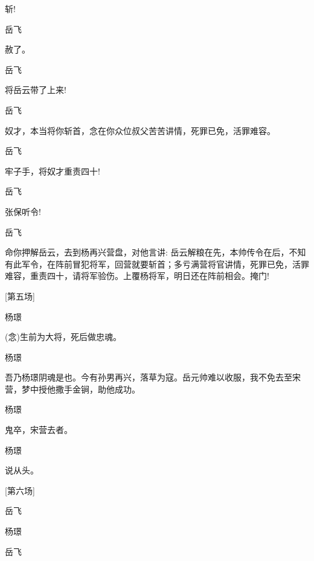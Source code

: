 {{{{斩!}

{岳飞\hspace{30pt}~

赦了。}

{岳飞\hspace{30pt}~

将岳云带了上来!}

{岳飞

奴才，本当将你斩首，念在你众位叔父苦苦讲情，死罪已免，活罪难容。}

{岳飞\hspace{30pt}~

牢子手，将奴才重责四十!}

{岳飞}\hspace{30pt}~

张保{听令!}

{岳飞

命你押解岳云，去到杨再兴营盘，对他言讲: 岳云解粮在先，本帅传令在后，不知有此军令，在阵前冒犯将军，回营就要斩首；多亏满营将官讲情，死罪已免，活罪难容，重责四十，请将军验伤。上覆杨将军，明日还在阵前相会。掩门!}

{{[}第五场{]}}

{杨璟\hspace{30pt}~

({\akai 念})生前为大将，死后做忠魂。}

{杨璟

吾乃杨璟阴魂是也。今有孙男再兴，落草为寇。岳元帅难以收服，我不免去至宋营，梦中授他撒手金锏，助他成功。}

{杨璟\hspace{30pt}~

鬼卒，宋营去者。}

{杨璟

说从头。 }

{{[}第六场{]}}

{岳飞

 }

{杨璟\hspace{30pt}~

 }

{岳飞\hspace{30pt}~

}}}}

